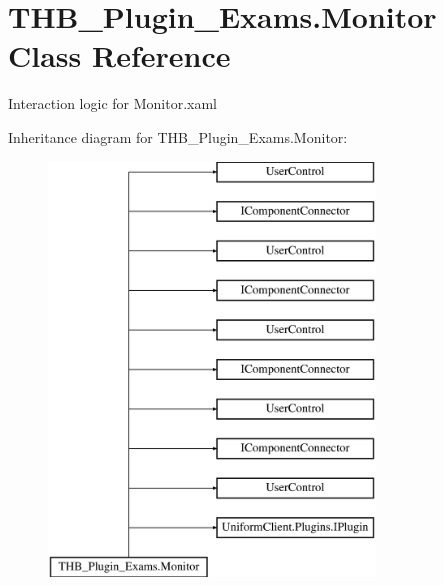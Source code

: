 \hypertarget{class_t_h_b___plugin___exams_1_1_monitor}{}\section{T\+H\+B\+\_\+\+Plugin\+\_\+\+Exams.\+Monitor Class Reference}
\label{class_t_h_b___plugin___exams_1_1_monitor}


Interaction logic for Monitor.\+xaml  


Inheritance diagram for T\+H\+B\+\_\+\+Plugin\+\_\+\+Exams.\+Monitor\+:\begin{figure}[H]
\begin{center}
\leavevmode
\includegraphics[height=11.000000cm]{d9/d79/class_t_h_b___plugin___exams_1_1_monitor}
\end{center}
\end{figure}
